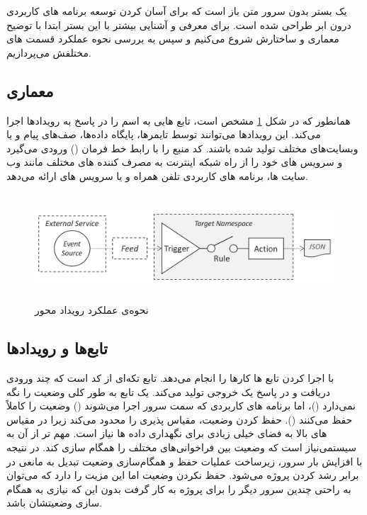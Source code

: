  یک بستر بدون سرور متن باز است که برای آسان کردن توسعه برنامه های کاربردی درون ابر طراحی شده است. برای معرفی و آشنایی بیشتر با این بستر ابتدا با توضیح معماری و ساختارش شروع می‌کنیم و سپس به بررسی نحوه عملکرد قسمت های مختلفش می‌پردازیم.

\subsection{معماری }

همانطور که در شکل \ref{OW-event-action} مشخص است،  تابع هایی به اسم  را در پاسخ به رویدادها اجرا می‌کند. این رویدادها می‌توانند توسط تایمرها، پایگاه داده‌ها، صف‌های پیام و یا وبسایت‌های مختلف تولید شده باشند.  کد منبع را با رابط خط فرمان () ورودی می‌گیرد و سرویس های خود را از راه  شبکه اینترنت به مصرف کننده های مختلف مانند وب سایت ها، برنامه های کاربردی تلفن همراه و یا سرویس های  ارائه می‌دهد. 
\begin{figure}[!h]
	\centering
	\includegraphics[height=4cm]{images/OW-event-action}
	\caption{نحوه‌ی عملکرد رویداد محور }
	\label{OW-event-action}
\end{figure}

\subsection{تابع‌ها و رویدادها}

 با اجرا کردن تابع ها کارها را انجام می‌دهد. تابع تکه‌ای از کد است که چند ورودی دریافت و در پاسخ یک خروجی تولید می‌کند. یک تابع به طور کلی وضعیت را نگه نمی‌دارد ()، اما برنامه های کاربردی که سمت سرور اجرا می‌شوند (‌) وضعیت را کاملاً حفظ می‌کنند (). حفظ کردن وضعیت، مقیاس پذیری را محدود می‌کند زیرا در مقیاس های بالا به فضای خیلی زیادی برای نگهداری داده ها نیاز است. مهم تر از آن به سیستمی‌نیاز است که وضعیت بین فراخوانی‌های مختلف را همگام سازی کند. در نتیجه با افزایش بار سرور، زیرساخت عملیات حفظ و همگام‌سازی وضعیت تبدیل به مانعی در برابر رشد کردن پروژه می‌شود. حفظ نکردن وضعیت اما این مزیت را دارد که می‌توان به راحتی چندین سرور دیگر را برای پروژه به کار گرفت بدون این که نیازی به همگام سازی وضعیتشان باشد.

